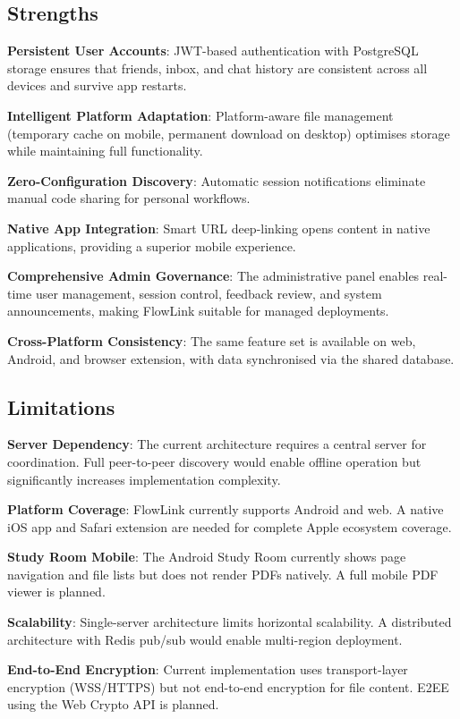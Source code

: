 \documentclass[conference]{IEEEtran}
\begin{document}
\subsection{Strengths}

\textbf{Persistent User Accounts}: JWT-based authentication with PostgreSQL storage ensures that friends, inbox, and chat history are consistent across all devices and survive app restarts.

\textbf{Intelligent Platform Adaptation}: Platform-aware file management (temporary cache on mobile, permanent download on desktop) optimises storage while maintaining full functionality.

\textbf{Zero-Configuration Discovery}: Automatic session notifications eliminate manual code sharing for personal workflows.

\textbf{Native App Integration}: Smart URL deep-linking opens content in native applications, providing a superior mobile experience.

\textbf{Comprehensive Admin Governance}: The administrative panel enables real-time user management, session control, feedback review, and system announcements, making FlowLink suitable for managed deployments.

\textbf{Cross-Platform Consistency}: The same feature set is available on web, Android, and browser extension, with data synchronised via the shared database.

\subsection{Limitations}

\textbf{Server Dependency}: The current architecture requires a central server for coordination. Full peer-to-peer discovery would enable offline operation but significantly increases implementation complexity.

\textbf{Platform Coverage}: FlowLink currently supports Android and web. A native iOS app and Safari extension are needed for complete Apple ecosystem coverage.

\textbf{Study Room Mobile}: The Android Study Room currently shows page navigation and file lists but does not render PDFs natively. A full mobile PDF viewer is planned.

\textbf{Scalability}: Single-server architecture limits horizontal scalability. A distributed architecture with Redis pub/sub would enable multi-region deployment.

\textbf{End-to-End Encryption}: Current implementation uses transport-layer encryption (WSS/HTTPS) but not end-to-end encryption for file content. E2EE using the Web Crypto API is planned.
\end{document}
